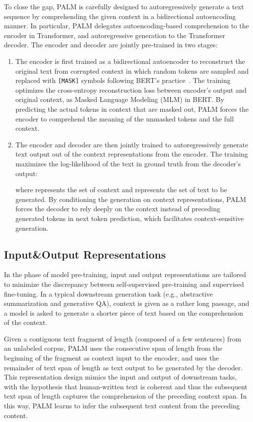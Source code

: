\documentclass[11pt,a4paper]{article}
\newcommand{\method}{PALM\xspace}
\begin{document}
To close the gap, \method is carefully designed to autoregressively generate a text sequence by comprehending the given context in a bidirectional autoencoding manner. In particular, \method delegates autoencoding-based comprehension to the encoder in Transformer, and autoregressive generation to the Transformer decoder. The encoder and decoder are jointly pre-trained in two stages:
\begin{enumerate}
    \item The encoder is first trained as a bidirectional autoencoder to reconstruct the original text from corrupted context in which random tokens are sampled and replaced with \texttt{[MASK]} symbols following BERT's practice~\cite{bert2018jacob}. The training optimizes the cross-entropy reconstruction loss between encoder's output and original context, as Masked Language Modeling (MLM) in BERT. By predicting the actual tokens in context that are masked out, \method forces the encoder to comprehend the meaning of the unmasked tokens and the full context.
    \item The encoder and decoder are then jointly trained to autoregressively generate text output out of the context representations from the encoder. The training maximizes the log-likelihood of the text in ground truth from the decoder's output:
    
    where  represents the set of context and  represents the set of text to be generated. By conditioning the generation on context representations, \method forces the decoder to rely deeply on the context instead of preceding generated tokens in next token prediction, which facilitates context-sensitive generation.
\end{enumerate}

\subsection{Input\&Output Representations}
\label{sec:in-out}
In the phase of model pre-training, input and output representations are tailored to minimize the discrepancy between self-supervised pre-training and supervised fine-tuning. In a typical downstream generation task (e.g., abstractive summarization and generative QA), context is given as a rather long passage, and a model is asked to generate a shorter piece of text based on the comprehension of the context.

Given a contiguous text fragment of length  (composed of a few sentences) from an unlabeled corpus, \method uses the consecutive span of length  from the beginning of the fragment as context input to the encoder, and uses the remainder of text span of length  as text output to be generated by the decoder. This representation design mimics the input and output of downstream tasks, with the hypothesis that human-written text is coherent and thus the subsequent text span of length  captures the comprehension of the preceding context span. In this way, \method learns to infer the subsequent text content from the preceding content.
\end{document}
